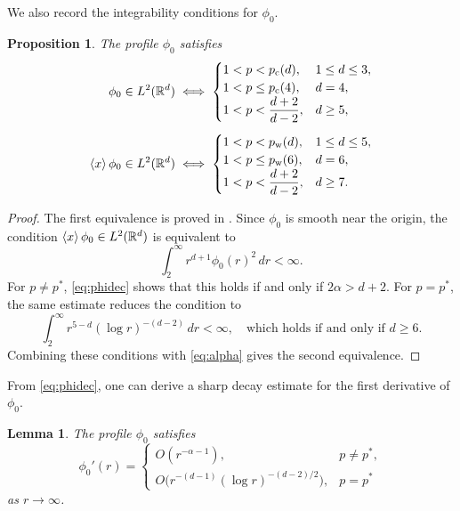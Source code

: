 \documentclass[12pt, a4paper, reqno]{amsart}
\numberwithin{equation}{section}
\newtheorem{proposition}[theorem]{Proposition}
\newtheorem{lemma}[theorem]{Lemma}
\theoremstyle{definition}
\theoremstyle{remark}
\newcommand{\R}{\mathbb R}
\begin{document}
We also record the integrability conditions for $\phi_0$.

\begin{proposition}
The profile $\phi_0$ satisfies\label{prop:phi-int}
\begin{align*}
  \phi_0\in L^2(\R^d)
  &\iff
  \begin{cases}
    1<p<p_{\mathrm{c}}(d), & 1\le d\le3,\\
    1<p\le p_{\mathrm{c}}(4), & d=4,\\
    1<p<\dfrac{d+2}{d-2}, & d\ge5,
  \end{cases}
  \\[4pt]
  \braket{x}\phi_0\in L^2(\R^d)
  &\iff
  \begin{cases}
    1<p<p_{\mathrm{w}}(d), & 1\le d\le5,\\
    1<p\le p_{\mathrm{w}}(6), & d=6,\\
    1<p<\dfrac{d+2}{d-2}, & d\ge7.
  \end{cases}
\end{align*}
\end{proposition}

\begin{proof}
The first equivalence is proved in \cite[Corollary~1.4]{FH21}.
Since $\phi_0$ is smooth near the origin, the condition
$\braket{x}\phi_0\in L^2(\R^d)$ is equivalent to
\[
  \int_2^\infty r^{d+1}\phi_0(r)^2\,dr<\infty.
\]
For $p\ne p^*$, \eqref{eq:phidec} shows that this holds if and only
if $2\alpha>d+2$. For $p=p^*$, the same estimate reduces the
condition to
\[
  \int_2^\infty r^{5-d}(\log r)^{-(d-2)}\,dr<\infty,
  \quad\text{which holds if and only if }d\ge6.
\]
Combining these conditions with \eqref{eq:alpha} gives the second
equivalence.
\end{proof}
From \eqref{eq:phidec}, one can derive a sharp decay estimate for the first derivative of $\phi_0$.
\begin{lemma}
\label{lem:dphi0}
The profile $\phi_0$ satisfies
\[
  \phi_0'(r)=
  \begin{cases}
    O(r^{-\alpha-1}), & p\ne p^*,\\[2pt]
    O\bigl(r^{-(d-1)}(\log r)^{-(d-2)/2}\bigr), & p=p^*
  \end{cases}
\]
as $r\to\infty$.
\end{lemma}
\end{document}
